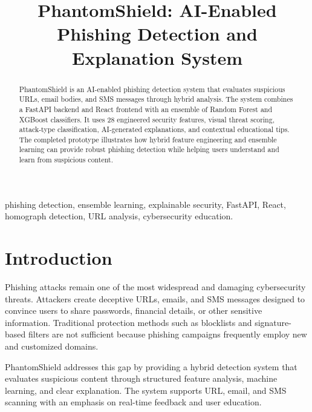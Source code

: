\documentclass[conference]{IEEEtran}
\begin{document}
\title{PhantomShield: AI-Enabled Phishing Detection and Explanation System}

\author{
}

\maketitle

\begin{abstract}
PhantomShield is an AI-enabled phishing detection system that evaluates suspicious URLs, email bodies, and SMS messages through hybrid analysis. The system combines a FastAPI backend and React frontend with an ensemble of Random Forest and XGBoost classifiers. It uses 28 engineered security features, visual threat scoring, attack-type classification, AI-generated explanations, and contextual educational tips. The completed prototype illustrates how hybrid feature engineering and ensemble learning can provide robust phishing detection while helping users understand and learn from suspicious content.
\end{abstract}

\begin{IEEEkeywords}
phishing detection, ensemble learning, explainable security, FastAPI, React, homograph detection, URL analysis, cybersecurity education.
\end{IEEEkeywords}

\section{Introduction}
Phishing attacks remain one of the most widespread and damaging cybersecurity threats. Attackers create deceptive URLs, emails, and SMS messages designed to convince users to share passwords, financial details, or other sensitive information. Traditional protection methods such as blocklists and signature-based filters are not sufficient because phishing campaigns frequently employ new and customized domains.

PhantomShield addresses this gap by providing a hybrid detection system that evaluates suspicious content through structured feature analysis, machine learning, and clear explanation. The system supports URL, email, and SMS scanning with an emphasis on real-time feedback and user education.
\end{document}
